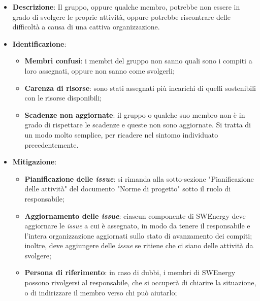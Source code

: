 \label{risk:organizzazione carente}
\begin{itemize}
	\item \textbf{Descrizione}:
	      Il gruppo, oppure qualche membro, potrebbe non essere in grado di
	      svolgere le proprie attività, oppure potrebbe riscontrare delle
	      difficoltà a causa di una cattiva organizzazione.
	\item \textbf{Identificazione}:
	      \begin{itemize}
		      \item \textbf{Membri confusi}: i membri del gruppo non sanno quali
		            sono i compiti a loro assegnati, oppure non sanno come
		            svolgerli;

		      \item \textbf{Carenza di risorse}: sono stati assegnati più
		            incarichi di quelli sostenibili con le risorse disponibili;

		      \item \textbf{Scadenze non aggiornate}: il gruppo o qualche suo
		            membro non è in grado di rispettare le scadenze e queste non
		            sono aggiornate. Si tratta di un modo molto semplice, per
		            ricadere nel sintomo individuato precedentemente.
	      \end{itemize}

	\item \textbf{Mitigazione}:
	      \begin{itemize}
		      \item \textbf{Pianificazione delle \textit{issue}\g}: si rimanda
		            alla sotto-sezione "Pianificazione delle attività" del
		            documento "Norme di progetto" sotto il ruolo di
		            responsabile;

		      \item \textbf{Aggiornamento delle \textit{issue}}:
		            ciascun componente di SWEnergy deve aggiornare le
		            \textit{issue} a cui è assegnato, in modo da tenere il
		            responsabile e l'intera organizzazione aggiornati sullo
		            stato di avanzamento dei compiti; inoltre, deve aggiungere
		            delle \textit{issue} se ritiene che ci siano delle attività
		            da svolgere;

		      \item \textbf{Persona di riferimento}: in caso di dubbi, i
		            membri di SWEnergy possono rivolgersi
		            al responsabile, che si occuperà di chiarire la situazione,
		            o di indirizzare il membro verso chi può aiutarlo;


\end{itemize}
\end{itemize}
